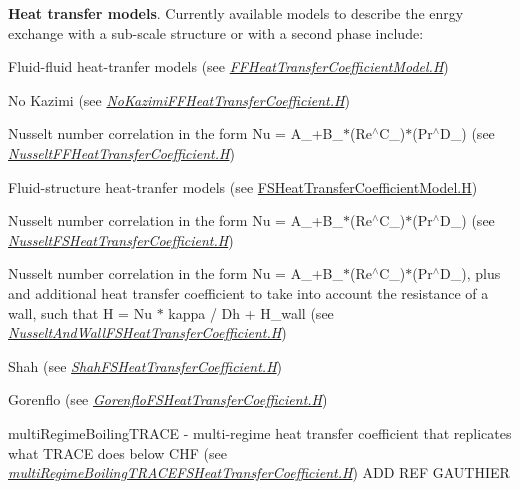  {\bfseries Heat transfer models}. Currently available models to describe the enrgy exchange with a sub-\/scale structure or with a second phase include\+: 
\begin{DoxyItemize}
\item Fluid-\/fluid heat-\/tranfer models (see {\itshape \hyperlink{FFHeatTransferCoefficientModel_8H}{F\+F\+Heat\+Transfer\+Coefficient\+Model.\+H}}) 
\begin{DoxyItemize}
\item No Kazimi (see {\itshape \hyperlink{NoKazimiFFHeatTransferCoefficient_8H}{No\+Kazimi\+F\+F\+Heat\+Transfer\+Coefficient.\+H}}) 
\item Nusselt number correlation in the form Nu = A\+\_\++\+B\+\_\+$\ast$(Re$^\wedge$\+C\+\_\+)$\ast$(Pr$^\wedge$\+D\+\_\+) (see {\itshape \hyperlink{NusseltFFHeatTransferCoefficient_8H}{Nusselt\+F\+F\+Heat\+Transfer\+Coefficient.\+H}}) 
\end{DoxyItemize}
\item Fluid-\/structure heat-\/tranfer models (see \hyperlink{FSHeatTransferCoefficientModel_8H}{F\+S\+Heat\+Transfer\+Coefficient\+Model.\+H}) 
\begin{DoxyItemize}
\item Nusselt number correlation in the form Nu = A\+\_\++\+B\+\_\+$\ast$(Re$^\wedge$\+C\+\_\+)$\ast$(Pr$^\wedge$\+D\+\_\+) (see {\itshape \hyperlink{NusseltFSHeatTransferCoefficient_8H}{Nusselt\+F\+S\+Heat\+Transfer\+Coefficient.\+H}}) 
\item Nusselt number correlation in the form Nu = A\+\_\++\+B\+\_\+$\ast$(Re$^\wedge$\+C\+\_\+)$\ast$(Pr$^\wedge$\+D\+\_\+), plus and additional heat transfer coefficient to take into account the resistance of a wall, such that H = Nu $\ast$ kappa / Dh + H\+\_\+wall (see {\itshape \hyperlink{NusseltAndWallFSHeatTransferCoefficient_8H}{Nusselt\+And\+Wall\+F\+S\+Heat\+Transfer\+Coefficient.\+H}}) 
\item Shah (see {\itshape \hyperlink{ShahFSHeatTransferCoefficient_8H}{Shah\+F\+S\+Heat\+Transfer\+Coefficient.\+H}}) 
\item Gorenflo (see {\itshape \hyperlink{GorenfloFSHeatTransferCoefficient_8H}{Gorenflo\+F\+S\+Heat\+Transfer\+Coefficient.\+H}}) 
\item multi\+Regime\+Boiling\+T\+R\+A\+CE -\/ multi-\/regime heat transfer coefficient that replicates what T\+R\+A\+CE does below C\+HF (see {\itshape \hyperlink{multiRegimeBoilingTRACEFSHeatTransferCoefficient_8H}{multi\+Regime\+Boiling\+T\+R\+A\+C\+E\+F\+S\+Heat\+Transfer\+Coefficient.\+H}}) A\+DD R\+EF G\+A\+U\+T\+H\+I\+ER 

\end{DoxyItemize}
\end{DoxyItemize}
